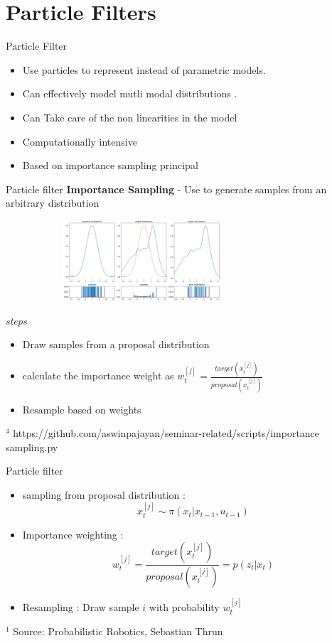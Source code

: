 \documentclass{beamer}
\begin{document}
\section{Particle Filters}
\begin{frame}{Particle Filter}
    \begin{itemize}
        \item Use particles to represent instead of parametric models.
        \item Can effectively model mutli modal distributions . 
        \item Can Take care of the non linearities in the model  
        \item Computationally intensive
        \item Based on importance sampling principal 
    \end{itemize}
\end{frame}


\begin{frame}{Particle filter}
    \textbf{Importance Sampling} - Use to generate samples from an arbitrary distribution\\
    \begin{figure}
        \includegraphics[height = 30mm, width = 80mm]{./importance_sampling.png}
    \end{figure}
    \textit{steps}
    \begin{itemize}
        \item Draw samples from a proposal distribution
        \item calculate the importance weight as $ w_t^{[j]} = \frac{target(x_t^{[j]})}{proposal(x_t^{[j]})}$
        \item Resample based on weights
    \end{itemize}
\tiny{$^{4}$} https://github.com/aswinpajayan/seminar-related/scripts/importance sampling.py
\end{frame}


\begin{frame}{Particle filter}
            \begin{itemize}
                \item sampling from proposal distribution : 
                    $$x_t^{[j]} \sim \pi(x_t|x_{t-1},u_{t-1})$$
                \item Importance weighting :
                    $$ w_t^{[j]} = \frac{target(x_t^{[j]})}{proposal(x_t^{[j]})} = p(z_t|x_t) $$
                \item Resampling : Draw sample $i$ with probability $w_t^{[j]}$
            \end{itemize}

\tiny{$^{1}$} Source: Probabilistic Robotics, Sebastian Thrun
\end{frame}
\end{document}

